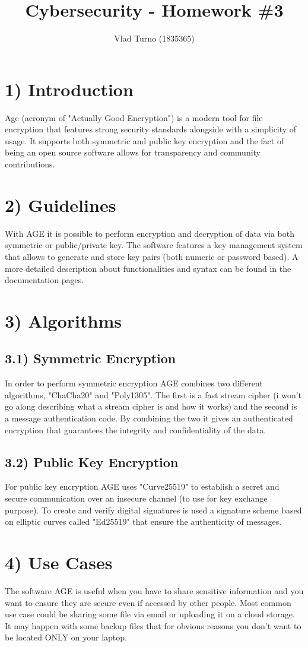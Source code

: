 \documentclass{article}
\title{Cybersecurity - Homework \#3}
\author{Vlad Turno (1835365)}
\begin{document}
\maketitle

\section*{1) Introduction}
Age (acronym of "Actually Good Encryption") is a modern tool for file encryption that features strong security standards alongside with a simplicity of usage.
It supports both symmetric and public key encryption and the fact of being an open source software allows for transparency and community contributions.

\section*{2) Guidelines}
With AGE it is possible to perform encryption and decryption of data via both symmetric or public/private key.
The software features a key management system that allows to generate and store key pairs (both numeric or password based).
A more detailed description about functionalities and syntax can be found in the documentation pages.

\section*{3) Algorithms}

\subsection*{3.1) Symmetric Encryption}
In order to perform symmetric encryption AGE combines two different algorithms, "ChaCha20" and "Poly1305".
The first is a fast stream cipher (i won't go along describing what a stream cipher is and how it works) and the second is a message authentication code.
By combining the two it gives an authenticated encryption that guarantees the integrity and confidentiality of the data.

\subsection*{3.2) Public Key Encryption}
For public key encryption AGE uses "Curve25519" to establish a secret and secure communication over an insecure channel (to use for key exchange purpose).
To create and verify digital signatures is used a signature scheme based on elliptic curves called "Ed25519" that ensure the authenticity of messages.

\section*{4) Use Cases}
The software AGE is useful when you have to share sensitive information and you want to ensure they are secure even if accessed by other people.
Most common use case could be sharing some file via email or uploading it on a cloud storage.
It may happen with some backup files that for obvious reasons you don't want to be located ONLY on your laptop.
\end{document}
